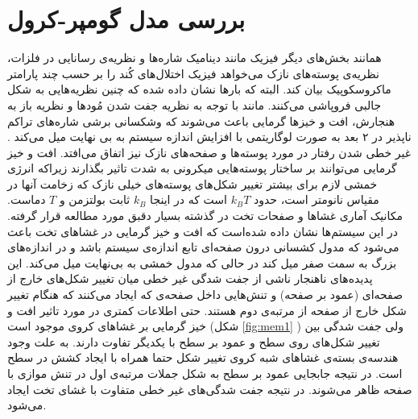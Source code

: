 \section{
بررسی مدل گومپر-کرول
}
همانند بخش‌های دیگر فیزیک مانند دینامیک شاره‌ها و نظریه‌ی رسانایی در فلزات، نظریه‌ی پوسته‌های نازک می‌خواهد فیزیک اختلال‌های کُند را بر حسب چند پارامتر ماکروسکوپیک بیان کند. البته که بارها نشان داده شده که چنین نظریه‌هایی به شکل‌ جالبی فروپاشی می‌کنند. مانند با توجه به نظریه جفت شدن مُود‌ها و نظریه باز به هنجارش، افت و خیز‌ها گرمایی باعث می‌شوند که وشکسانی برشی
شاره‌های تراکم ناپذیر در ۲ بعد به صورت لوگاریتمی با افزایش اندازه سیستم به بی نهایت میل می‌کند 
\cite{gomppernelson2012}
. غیر خطی شدن رفتار در مورد پوسته‌ها و صفحه‌های نازک نیز اتفاق می‌افتد. افت و خیز گرمایی می‌توانند بر ساختار پوسته‌هایی میکرونی به شدت تاثیر بگذارند زیراکه انرژی خمشی لازم برای بیشتر تغییر شکل‌های پوسته‌های خیلی نازک که زخامت آنها در مقیاس نانومتر است، حدود $k_BT$ است که در اینجا $k_B$ ثابت بولتزمن و
$T$
دماست. مکانیک آماری غشاها و صفحات تخت در گذشته بسیار دقبق مورد مطالعه قرار گرفته. در این سیستم‌ها نشان داده شده‌است که افت و خیز گرمایی در غشاهای تخت باعث می‌شود که مدول کشسانی درون صفحه‌ای
 تابع اندازه‌‌ی سیستم باشد و در اندازه‌های بزرگ به سمت صفر میل کند در حالی که مدول خمشی به بی‌نهایت میل می‌کند. این پدیده‌های ناهنجار ناشی از جفت شدگی غیر خطی میان تغییر شکل‌های خارج از صفحه‌ای (عمود بر صفحه) و تنش‌هایی داخل صفحه‌ی که ایجاد می‌کنند که هنگام تغییر شکل خارج از صفحه از مرتبه‌ی دوم هستند. حتی اطلاعات کمتری در مورد تاثیر افت و خیز گرمایی بر غشا‌های کروی موجود است (شکل 
 \ref{fig:mem1}
)
ولی جفت شدگی بین تغییر شکل‌های روی سطح و عمود بر سطح با یکدیگر تفاوت دارند. به علت وجود هندسه‌ی بسته‌ی غشاهای شبه کروی تغییر شکل حتما همراه با ایجاد کشش در سطح است. در نتیجه جابجایی عمود بر سطح به شکل جملات مرتبه‌ی اول در تنش موازی با صفحه ظاهر می‌شوند. در نتیجه جفت‌ شدگی‌های غیر خطی متفاوت با غشای تخت ایجاد می‌‌شود.

